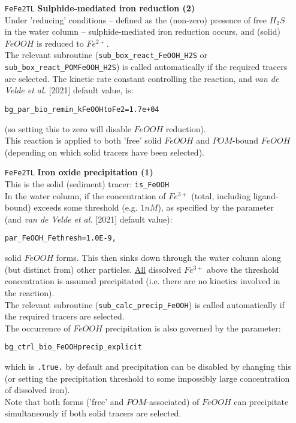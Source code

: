 \begin{itemize}[noitemsep]
\vspace{1mm}
\item [\texttt{FeFe2TL}] \textbf{Sulphide-mediated iron reduction (2)}
\\Under 'reducing' conditions -- defined as the (non-zero) presence of free \(H_{2}S\) in the water column -- sulphide-mediated iron reduction occurs, and (solid) \(FeOOH\) is reduced to \(Fe^{2+}\).
\\The relevant subroutine (\texttt{sub\_box\_react\_FeOOH\_H2S} or \texttt{sub\_box\_react\_POMFeOOH\_H2S}) is called automatically if the required tracers are selected. The kinetic rate constant controlling the reaction, and \textit{van de Velde et al.} [2021] default value, is:
\vspace{-1mm}\small\begin{verbatim}
bg_par_bio_remin_kFeOOHtoFe2=1.7e+04
\end{verbatim}\normalsize\vspace{-1mm}
(so setting this to zero will disable \(FeOOH\) reduction).
\\This reaction is applied to both 'free' solid \(FeOOH\) and \(POM\)-bound \(FeOOH\) (depending on which solid tracers have been selected).

\vspace{1mm}
\item [\texttt{FeFe2TL}] \textbf{Iron oxide precipitation (1)}
\\This is the solid (sediment) tracer: \texttt{is\_FeOOH}
\\In the water column, if the concentration of \(Fe^{3+}\) (total, including ligand-bound) exceeds some threshold (e.g. \(1nM\)), as specified by the parameter (and \textit{van de Velde et al.} [2021] default value):
\vspace{-1mm}\small\begin{verbatim}
par_FeOOH_Fethresh=1.0E-9,
\end{verbatim}\normalsize\vspace{-1mm}
solid \(FeOOH\) forms. This then sinks down through the water column along (but distinct from)  other particles. \uline{All} dissolved \(Fe^{3+}\) above the threshold concentration is assumed precipitated (i.e. there are no kinetics involved in the reaction).
\\The relevant subroutine (\texttt{sub\_calc\_precip\_FeOOH}) is called automatically if the required tracers are selected.
\\The occurrence of \(FeOOH\) precipitation is also governed by the parameter:
\vspace{-1mm}\small\begin{verbatim}
bg_ctrl_bio_FeOOHprecip_explicit
\end{verbatim}\normalsize\vspace{-1mm}
which is \texttt{.true.} by default and precipitation can be disabled by changing this (or setting the precipitation threshold to some impossibly large concentration of dissolved iron).
\\Note that both forms ('free' and \(POM\)-associated) of \(FeOOH\) can precipitate simultaneously if both solid tracers are selected.


\end{itemize}
